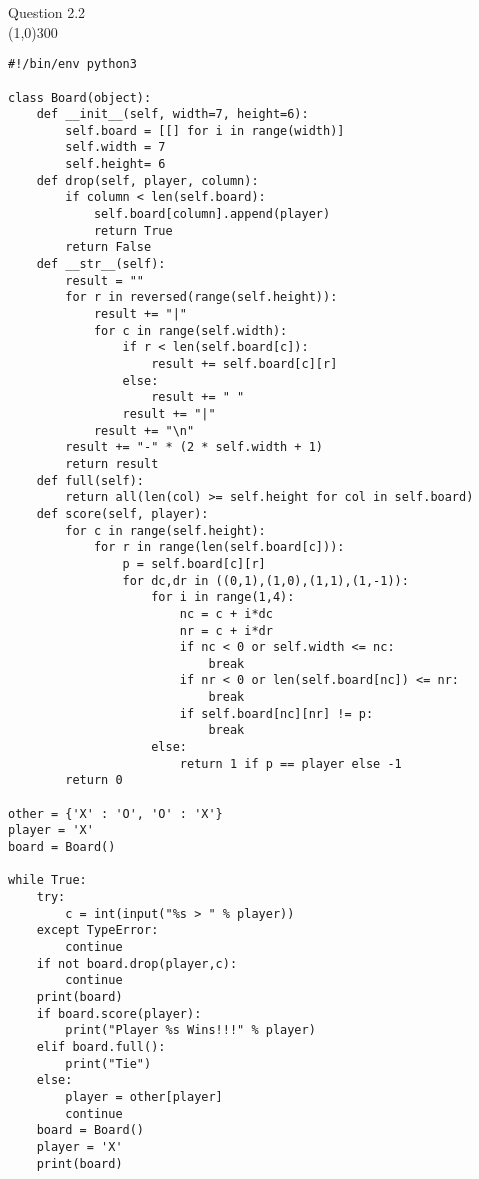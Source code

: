 \documentclass{article}
\begin{document}
{%
Question 2.2\\
\line(1,0){300}
\begin{verbatim}
#!/bin/env python3

class Board(object):
    def __init__(self, width=7, height=6):
        self.board = [[] for i in range(width)]
        self.width = 7
        self.height= 6
    def drop(self, player, column):
        if column < len(self.board):
            self.board[column].append(player)
            return True
        return False
    def __str__(self):
        result = ""
        for r in reversed(range(self.height)):
            result += "|"
            for c in range(self.width):
                if r < len(self.board[c]):
                    result += self.board[c][r]
                else:
                    result += " "
                result += "|"
            result += "\n"
        result += "-" * (2 * self.width + 1)
        return result
    def full(self):
        return all(len(col) >= self.height for col in self.board)
    def score(self, player):
        for c in range(self.height):
            for r in range(len(self.board[c])):
                p = self.board[c][r]
                for dc,dr in ((0,1),(1,0),(1,1),(1,-1)):
                    for i in range(1,4):
                        nc = c + i*dc
                        nr = c + i*dr
                        if nc < 0 or self.width <= nc:
                            break
                        if nr < 0 or len(self.board[nc]) <= nr:
                            break
                        if self.board[nc][nr] != p:
                            break
                    else:
                        return 1 if p == player else -1
        return 0

other = {'X' : 'O', 'O' : 'X'}
player = 'X'
board = Board()

while True:
    try:
        c = int(input("%s > " % player))
    except TypeError:
        continue
    if not board.drop(player,c):
        continue
    print(board)
    if board.score(player):
        print("Player %s Wins!!!" % player)
    elif board.full():
        print("Tie")
    else:
        player = other[player]
        continue
    board = Board()
    player = 'X'
    print(board)
\end{verbatim}
}
\end{document}

